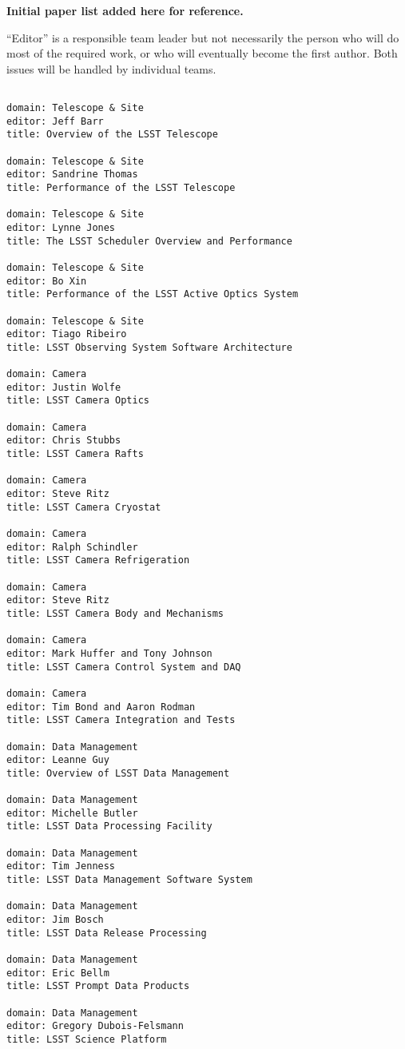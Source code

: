 \appendix{}

{\bf Initial paper list added here for reference.}  

``Editor'' is a responsible team leader but not necessarily the person who will do most of 
the required work, or who will eventually become the first author. Both issues will be 
handled by individual teams. 

\begin{verbatim}

domain: Telescope & Site
editor: Jeff Barr
title: Overview of the LSST Telescope

domain: Telescope & Site
editor: Sandrine Thomas 
title: Performance of the LSST Telescope

domain: Telescope & Site
editor: Lynne Jones
title: The LSST Scheduler Overview and Performance 

domain: Telescope & Site
editor: Bo Xin
title: Performance of the LSST Active Optics System  

domain: Telescope & Site
editor: Tiago Ribeiro
title: LSST Observing System Software Architecture

domain: Camera 
editor: Justin Wolfe 
title: LSST Camera Optics 

domain: Camera 
editor: Chris Stubbs 
title: LSST Camera Rafts 

domain: Camera 
editor: Steve Ritz 
title: LSST Camera Cryostat

domain: Camera 
editor: Ralph Schindler 
title: LSST Camera Refrigeration

domain: Camera 
editor: Steve Ritz  
title: LSST Camera Body and Mechanisms 

domain: Camera 
editor: Mark Huffer and Tony Johnson
title: LSST Camera Control System and DAQ 

domain: Camera 
editor: Tim Bond and Aaron Rodman 
title: LSST Camera Integration and Tests 

domain: Data Management 
editor: Leanne Guy 
title: Overview of LSST Data Management

domain: Data Management 
editor: Michelle Butler 
title: LSST Data Processing Facility

domain: Data Management 
editor: Tim Jenness
title: LSST Data Management Software System

domain: Data Management 
editor: Jim Bosch 
title: LSST Data Release Processing

domain: Data Management 
editor: Eric Bellm 
title: LSST Prompt Data Products

domain: Data Management 
editor: Gregory Dubois-Felsmann
title: LSST Science Platform

\end{verbatim}
